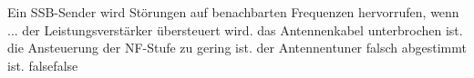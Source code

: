     {Ein SSB-Sender wird Störungen auf benachbarten Frequenzen hervorrufen, wenn ...}
    {der Leistungsverstärker übersteuert wird.}
    {das Antennenkabel unterbrochen ist.}
    {die Ansteuerung der NF-Stufe zu gering ist.}
    {der Antennentuner falsch abgestimmt ist.}
    {false}{false}